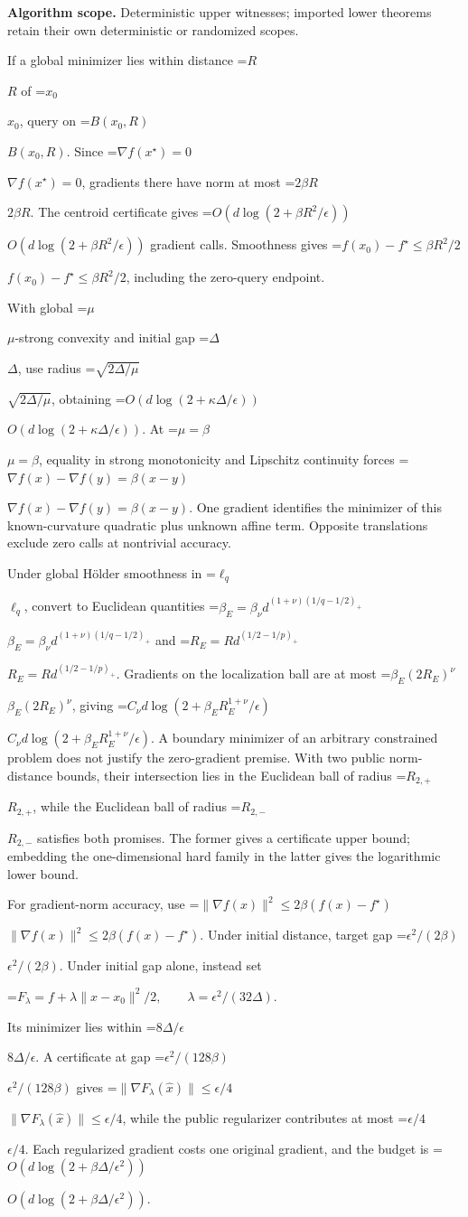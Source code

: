 \documentclass[10pt,a4paper]{article}
\newcommand{\AtlasMath}[1]{\par\begingroup\centering\setbox0=\hbox{$\displaystyle #1$}\ifdim\wd0>1.4\linewidth\typeout{ATLAS WIDE FORMULA: \the\wd0}\fi\ifdim\wd0>\linewidth\resizebox{\linewidth}{!}{\box0}\else\box0\fi\par\endgroup}
\newcommand{\AtlasInlineMath}[1]{\begingroup\setbox0=\hbox{$#1$}\ifdim\wd0>.4\linewidth\endgroup\AtlasMath{#1}\else\endgroup$#1$\fi}
\begin{document}
\textbf{Algorithm scope.} Deterministic upper witnesses; imported lower theorems retain their own deterministic or randomized scopes.

If a global minimizer lies within distance \AtlasInlineMath{R} of \AtlasInlineMath{x_0}, query on \AtlasInlineMath{B(x_0,R)}. Since \AtlasInlineMath{\nabla f(x^\star)=0}, gradients there have norm at most \AtlasInlineMath{2\beta R}. The centroid certificate gives \AtlasInlineMath{O(d\log(2+\beta R^2/\epsilon))} gradient calls. Smoothness gives \AtlasInlineMath{f(x_0)-f^\star\le\beta R^2/2}, including the zero-query endpoint.

With global \AtlasInlineMath{\mu}-strong convexity and initial gap \AtlasInlineMath{\Delta}, use radius \AtlasInlineMath{\sqrt{2\Delta/\mu}}, obtaining \AtlasInlineMath{O(d\log(2+\kappa\Delta/\epsilon))}. At \AtlasInlineMath{\mu=\beta}, equality in strong monotonicity and Lipschitz continuity forces \AtlasInlineMath{\nabla f(x)-\nabla f(y)=\beta(x-y)}. One gradient identifies the minimizer of this known-curvature quadratic plus unknown affine term. Opposite translations exclude zero calls at nontrivial accuracy.

Under global Hölder smoothness in \AtlasInlineMath{\ell_q}, convert to Euclidean quantities
\AtlasInlineMath{\beta_E=\beta_\nu d^{(1+\nu)(1/q-1/2)_+}} and
\AtlasInlineMath{R_E=Rd^{(1/2-1/p)_+}}. Gradients on the localization ball are at most \AtlasInlineMath{\beta_E(2R_E)^\nu}, giving
\AtlasInlineMath{C_\nu d\log(2+\beta_E R_E^{1+\nu}/\epsilon)}.
A boundary minimizer of an arbitrary constrained problem does not justify the zero-gradient premise. With two public norm-distance bounds, their intersection lies in the Euclidean ball of radius \AtlasInlineMath{R_{2,+}}, while the Euclidean ball of radius \AtlasInlineMath{R_{2,-}} satisfies both promises. The former gives a certificate upper bound; embedding the one-dimensional hard family in the latter gives the logarithmic lower bound.

For gradient-norm accuracy, use \AtlasInlineMath{\|\nabla f(x)\|^2\le2\beta(f(x)-f^\star)}. Under initial distance, target gap \AtlasInlineMath{\epsilon^2/(2\beta)}. Under initial gap alone, instead set

\AtlasMath{F_\lambda=f+\lambda\|x-x_0\|^2/2,\qquad\lambda=\epsilon^2/(32\Delta).}

Its minimizer lies within \AtlasInlineMath{8\Delta/\epsilon}. A certificate at gap \AtlasInlineMath{\epsilon^2/(128\beta)} gives \AtlasInlineMath{\|\nabla F_\lambda(\widehat x)\|\le\epsilon/4}, while the public regularizer contributes at most \AtlasInlineMath{\epsilon/4}. Each regularized gradient costs one original gradient, and the budget is \AtlasInlineMath{O(d\log(2+\beta\Delta/\epsilon^2))}.
\end{document}
